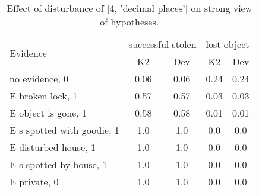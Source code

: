 \begin{table}\begin{tabular}{l|cc|cc}\toprule\multirow{2}{*}{Evidence} & \multicolumn{2}{c}{successful stolen}& \multicolumn{2}{c}{lost object}\\& {K2} & {Dev}& {K2} & {Dev}\\\midrule
no evidence, 0 & 0.06&0.06&0.24&0.24\\E broken lock, 1 & 0.57&0.57&0.03&0.03\\E object is gone, 1 & 0.58&0.58&0.01&0.01\\E s spotted with goodie, 1 & 1.0&1.0&0.0&0.0\\E disturbed house, 1 & 1.0&1.0&0.0&0.0\\E s spotted by house, 1 & 1.0&1.0&0.0&0.0\\E private, 0 & 1.0&1.0&0.0&0.0\\\bottomrule\end{tabular}\caption{Effect of disturbance of [4, 'decimal places'] on strong view of hypotheses.}\end{table}